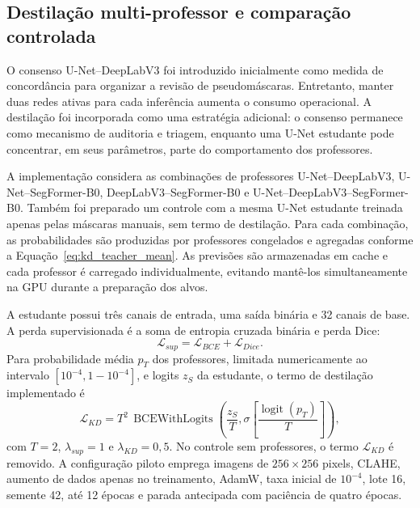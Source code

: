 \documentclass[12pt]{article}
\begin{document}
\subsection{Destilação multi-professor e comparação controlada}

O consenso U-Net--DeepLabV3 foi introduzido inicialmente como medida de concordância para organizar a revisão de pseudomáscaras. Entretanto, manter duas redes ativas para cada inferência aumenta o consumo operacional. A destilação foi incorporada como uma estratégia adicional: o consenso permanece como mecanismo de auditoria e triagem, enquanto uma U-Net estudante pode concentrar, em seus parâmetros, parte do comportamento dos professores.

A implementação considera as combinações de professores U-Net--DeepLabV3, U-Net--SegFormer-B0, DeepLabV3--SegFormer-B0 e U-Net--DeepLabV3--SegFormer-B0. Também foi preparado um controle com a mesma U-Net estudante treinada apenas pelas máscaras manuais, sem termo de destilação. Para cada combinação, as probabilidades são produzidas por professores congelados e agregadas conforme a Equação~\ref{eq:kd_teacher_mean}. As previsões são armazenadas em cache e cada professor é carregado individualmente, evitando mantê-los simultaneamente na GPU durante a preparação dos alvos.

A estudante possui três canais de entrada, uma saída binária e 32 canais de base. A perda supervisionada é a soma de entropia cruzada binária e perda Dice:
\begin{equation}
 \mathcal{L}_{sup}=\mathcal{L}_{BCE}+\mathcal{L}_{Dice}.
 \label{eq:kd_supervised}
\end{equation}
Para probabilidade média $p_T$ dos professores, limitada numericamente ao intervalo $[10^{-4},1-10^{-4}]$, e logits $z_S$ da estudante, o termo de destilação implementado é
\begin{equation}
 \mathcal{L}_{KD}=T^2\,\operatorname{BCEWithLogits}
 \left(\frac{z_S}{T},
 \sigma\!\left[\frac{\operatorname{logit}(p_T)}{T}\right]\right),
 \label{eq:kd_binary}
\end{equation}
com $T=2$, $\lambda_{sup}=1$ e $\lambda_{KD}=0{,}5$. No controle sem professores, o termo $\mathcal{L}_{KD}$ é removido. A configuração piloto emprega imagens de $256\times256$ pixels, CLAHE, aumento de dados apenas no treinamento, AdamW, taxa inicial de $10^{-4}$, lote 16, semente 42, até 12 épocas e parada antecipada com paciência de quatro épocas.
\end{document}
